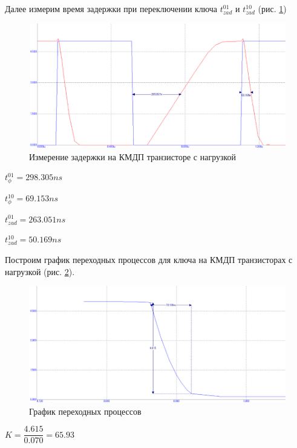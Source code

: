 \documentclass[a4paper,14pt]{article}
\begin{document}
Далее измерим время задержки при переключении ключа $t^{01}_{zad}$ и $t^{10}_{zad}$ (рис. \ref{fig:kmdpgrafzadnagr})

\begin{figure}[H]
	\centering
	\includegraphics[width=0.7\linewidth]{image/KMDP_graf_zad_nagr}
	\caption{Измерение задержки на КМДП транзисторе с нагрузкой}
	\label{fig:kmdpgrafzadnagr}
\end{figure}

$t^{01}_{\phi} = 298.305ns$

$t^{10}_{\phi} = 69.153ns$

$t^{01}_{zad} = 263.051ns$

$t^{10}_{zad} = 50.169ns$

Построим график переходных процессов для ключа на КМДП транзисторах с нагрузкой (рис. \ref{fig:kmdpgrafper}).

\begin{figure}[H]
	\centering
	\includegraphics[width=0.7\linewidth]{image/KMDP_graf_per}
	\caption{График переходных процессов }
	\label{fig:kmdpgrafper}
\end{figure}

$K = \dfrac{4.615}{0.070} = 65.93$




 
\end{document}
